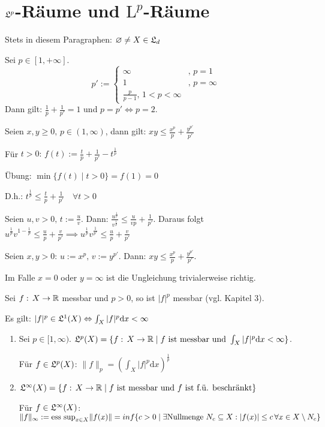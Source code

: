 \documentclass[a4paper,twoside,DIV15,BCOR12mm,chapterprefix=true,headings=onelinechapter]{scrbook}
\begin{document}
\chapter{$\mathfrak{L}^{p}$-R\"aume und $\mathrm{L}^{p}$-R\"aume}
Stets in diesem Paragraphen: \(\varnothing\neq X\in\mathfrak{L}_{d}\)

\begin{definition}
Sei \(p\in[1,+\infty]\).
\[
p':=\begin{cases}
\infty&,\,p=1\\
1&,\,p=\infty\\
\frac{p}{p-1},\,1<p<\infty
\end{cases}
\]
Dann gilt: \(\frac{1}{p}+\frac{1}{p'}=1\) und \(p=p'\Leftrightarrow p=2\).
\end{definition}

\begin{hilfssatz}
Seien \(x,y\geq 0,\,p\in(1,\infty)\), dann gilt: \(xy\leq\frac{x^{p}}{p}+\frac{y^{p'}}{p'}\)
\end{hilfssatz}
\begin{beweis}
F\"ur \(t>0:\,f(t):=\frac{t}{p}+\frac{1}{p'}-t^{\frac{1}{p}}\)

\"Ubung: \(\min\{f(t)\mid t>0\}=f(1)=0\)

D.h.: \(t^{\frac{1}{p}}\leq\frac{t}{p}+\frac{1}{p'}\quad\forall t>0\)

Seien \(u,v>0,\,t:=\frac{u}{v}\). Dann: \(\frac{u^{\frac{1}{p}}}{v^{\frac{1}{p}}}\leq\frac{u}{vp}+\frac{1}{p'}\). Daraus folgt
\(u^{\frac{1}{p}}v^{1-\frac{1}{p}}\leq\frac{u}{p}+\frac{v}{p'}\implies u^{\frac{1}{p}}v^{\frac{1}{p'}}\leq \frac{u}{p}+\frac{v}{p'}\)

Seien \(x,y>0:\,u:=x^{p},\,v:=y^{p'}\). Dann: \(xy\leq\frac{x^{p}}{p}+\frac{y^{p'}}{p'}\).

Im Falle \(x=0\) oder \(y=\infty\) ist die Ungleichung trivialerweise richtig.
\end{beweis}

\begin{erinnerung}
Sei \(f:\,X\to\mathbb{R}\) messbar und \(p>0\), so ist \(\lvert f\rvert^{p}\) messbar (vgl. Kapitel 3).

Es gilt: \(\lvert f\rvert^{p}\in\mathfrak{L}^{1}(X)\Leftrightarrow \int_{X}{\lvert f\rvert^{p}\mathrm{d}x}<\infty\)
\end{erinnerung}

\begin{definition}
\begin{enumerate}
\item Sei \(p\in[1,\infty)\). \(\mathfrak{L}^{p}(X)=\{f:\,X\to\mathbb{R}\mid f \text{ ist messbar und }\int_{X}{\lvert f\rvert^{p}\mathrm{d}x<\infty}\}\).

F\"ur \(f\in\mathfrak{L}^{p}(X)\): \(\lVert f\rVert_{p}=\left(\int_{X}{\lvert f\rvert^{p}\mathrm{d}x}\right)^{\frac{1}{p}}\)
\item \(\mathfrak{L}^{\infty}(X)=\{f:\,X\to\mathbb{R}\mid f\text{ ist messbar und }f\text{ ist f.\"u. beschr\"ankt}\}\)

F\"ur \(f\in\mathfrak{L}^{\infty}(X)\): \(\lVert f\rVert_{\infty}:=\text{ess sup}_{x\in X}\lVert f(x)\rVert=inf\{c>0\mid \exists\text{Nullmenge }N_{c}\subseteq X: \lvert f(x)\rvert\leq c\,\forall x\in X\setminus N_{c}\}\)
\end{enumerate}
\end{definition}
\end{document}
